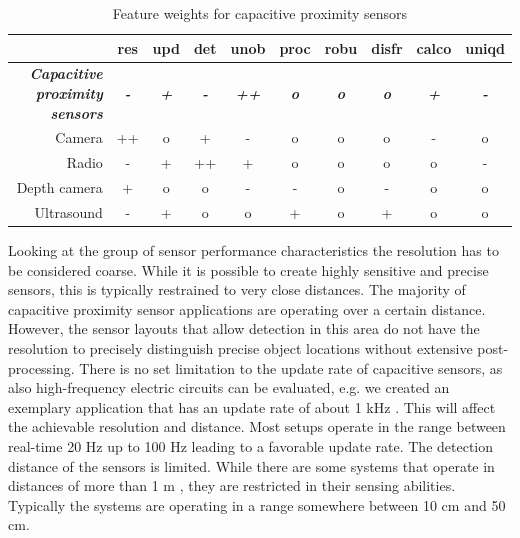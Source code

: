 \begin{table}[htbp]
  \centering
  \caption{Feature weights for capacitive proximity sensors}
    \begin{tabular}{rccccccccc}
    \toprule
          & res   & upd   & det   & unob  & proc  & robu  & disfr & calco & uniqd \\
    \midrule
    \textit{\textbf{Capacitive proximity sensors}} & \textit{\textbf{-}} & \textit{\textbf{+}} & \textit{\textbf{-}} & \textit{\textbf{++}} & \textit{\textbf{o}} & \textit{\textbf{o}} & \textit{\textbf{o}} & \textit{\textbf{+}} & \textit{\textbf{-}} \\
    \midrule
    Camera & ++    & o     & +     & -     & o     & o     & o     & -     & o \\
    Radio & -     & +     & ++    & +     & o     & o     & o     & o     & - \\
    Depth camera & +     & o     & o     & -     & -     & o     & -     & o     & o \\
    Ultrasound & -     & +     & o     & o     & +     & o     & +     & o     & o \\
    \bottomrule
    \end{tabular}%

  \label{tab:bench_cap_feat_weights}
\end{table}



Looking at the group of sensor performance characteristics the resolution has to be considered coarse. While it is possible to create highly sensitive and precise sensors, this is typically restrained to very close distances. The majority of capacitive proximity sensor applications are operating over a certain distance. However, the sensor layouts that allow detection in this area do not have the resolution to precisely distinguish precise object locations without extensive post-processing. There is no set limitation to the update rate of capacitive sensors, as also high-frequency electric circuits can be evaluated, e.g. we created an exemplary application that has an update rate of about 1 kHz \cite{grosse2013opencapsense}. This will affect the achievable resolution and distance. Most setups operate in the range between real-time 20 Hz up to 100 Hz leading to a favorable update rate. The detection distance of the sensors is limited. While there are some systems that operate in distances of more than 1 m \cite{MacLachlan2004}, they are restricted in their sensing abilities. Typically the systems are operating in a range somewhere between 10 cm and 50 cm. 


